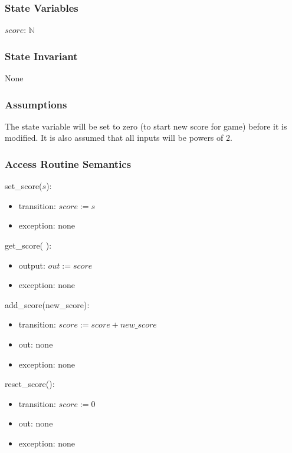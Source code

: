 \documentclass[12pt]{article}
\begin{document}
\subsubsection* {State Variables}

$\mathit{score}$: $\mathbb{N}$

\subsubsection* {State Invariant}

None

\subsubsection* {Assumptions}

The state variable will be set to zero (to start new score for game) before it is modified. It is also assumed that all inputs will be powers of $2$.

\subsubsection* {Access Routine Semantics}

\noindent set\_score($\mathit{s}$):
\begin{itemize}
\item transition: $\mathit{score} := \mathit{s}$
\item exception: none
\end{itemize}

\noindent get\_score( ):
\begin{itemize}
\item output: $out := \mathit{score}$
\item exception: none
\end{itemize}

\noindent add\_score(new_score):
\begin{itemize}
\item transition: $\mathit{score} := \mathit{score + new\_score}$
\item out: none
\item exception: none
\end{itemize}

\noindent reset\_score():
\begin{itemize}
\item transition: $\mathit{score} := 0$
\item out: none
\item exception: none
\end{itemize}
\end{document}

